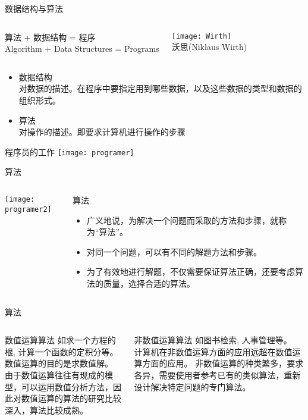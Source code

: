 \begin{frame}{数据结构与算法}
\begin{columns}
	\begin{block}{}
		算法 + 数据结构 = 程序\\
		Algorithm + Data Structures = Programs
	\end{block}
	\texttt{[image: Wirth]}\\
	沃思(Niklaus Wirth)
\end{columns}
\begin{itemize}
	\item 数据结构\\
	对数据的描述。在程序中要指定用到哪些数据，以及这些数据的类型和数据的组织形式。
	\item 	算法\\
	对操作的描述。即要求计算机进行操作的步骤	
\end{itemize}
\end{frame}

\begin{frame}{程序员的工作}
\centering
\texttt{[image: programer]}
\end{frame}

\begin{frame}{算法}
\begin{columns}
	\texttt{[image: programer2]}
	\begin{block}{算法}
		\begin{itemize}
			\item 广义地说，为解决一个问题而采取的方法和步骤，就称为“算法”。
		    \item 对同一个问题，可以有不同的解题方法和步骤。
		    \item 为了有效地进行解题，不仅需要保证算法正确，还要考虑算法的质量，选择合适的算法。
		\end{itemize} 
	\end{block}
\end{columns}
\end{frame}

\begin{frame}{算法}
\begin{columns}[t]
	\begin{block}{数值运算算法}
	   如求一个方程的根, 计算一个函数的定积分等。\\
	   数值运算的目的是求数值解。\\
	   由于数值运算往往有现成的模型，可以运用数值分析方法，因此对数值运算的算法的研究比较深入，算法比较成熟。	
	\end{block}
	\begin{block}{非数值运算算法}
		如图书检索, 人事管理等。\\
		计算机在非数值运算方面的应用远超在数值运算方面的应用。
		非数值运算的种类繁多，要求各异，需要使用者参考已有的类似算法，重新设计解决特定问题的专门算法。
	\end{block}
\end{columns}
\end{frame}

